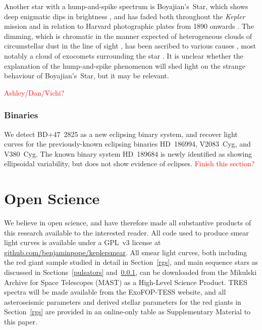 \documentclass[a4paper,fleqn,usenatbib]{mnras}
\newcommand{\kepler}{\emph{Kepler}\xspace}
\begin{document}
Another star with a hump-and-spike spectrum is Boyajian's~Star, which shows deep enigmatic dips in brightness \citep{2016MNRAS.457.3988B}, and has faded both throughout the \kepler mission \citep{2016ApJ...830L..39M} and in relation to Harvard photographic plates from 1890 onwards \citep{2016ApJ...822L..34S}. The dimming, which is chromatic in the manner expected of heterogeneous clouds of circumstellar dust in the line of sight \citep{2018ApJ...853..130D,2018arXiv180608842B}, has been ascribed to various causes \citep[reviewed in][]{2018RNAAS...2a..16W}, most notably a cloud of exocomets surrounding the star \citep[e.g.][]{2018MNRAS.473.5286W}. It is unclear whether the explanation of the hump-and-spike phenomenon will shed light on the strange behaviour of Boyajian's~Star, but it may be relevant.

\textcolor{red}{Ashley/Dan/Vichi?}

\subsubsection{Binaries}
\label{ebs}

We detect BD+47~2825 as a new eclipsing binary system, and recover light curves for the previously-known eclipsing binaries HD~186994, V2083~Cyg, and V380~Cyg. The known binary system HD~189684 is newly identified as showing ellipsoidal variability, but does not show evidence of eclipses. \textcolor{red}{Finish this section?}

\section{Open Science}
\label{open}

We believe in open science, and have therefore made all substantive products of this research available to the interested reader. All code used to produce smear light curves is available under a GPL~v3 license at \url{github.com/benjaminpope/keplersmear}. All smear light curves, both including the red giant sample studied in detail in Section~\ref{rgs}, and main sequence stars as discussed in Sections~\ref{pulsators} and~\ref{ebs}, can be downloaded from the Mikulski Archive for Space Telescopes (MAST) as a High-Level Science Product. TRES spectra will be made available from the ExoFOP-TESS website, and all asteroseismic parameters and derived stellar parameters for the red giants in Section~\ref{rgs} are provided in an online-only table as Supplementary Material to this paper.
\end{document}
